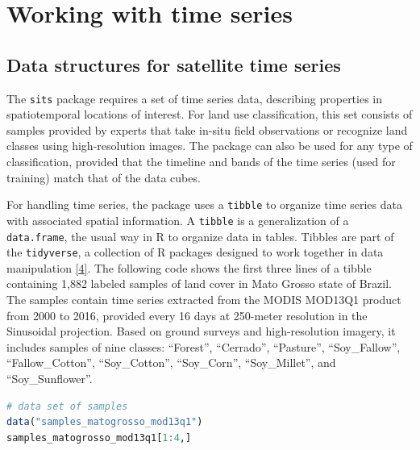 \documentclass[
  11pt,
]{report}
\newcommand{\passthrough}[1]{#1}
\begin{document}
\hypertarget{working-with-time-series}{%
\chapter*{Working with time series}\label{working-with-time-series}}

\hypertarget{data-structures-for-satellite-time-series}{%
\section*{Data structures for satellite time
series}\label{data-structures-for-satellite-time-series}}

The \passthrough{\lstinline!sits!} package requires a set of time series
data, describing properties in spatiotemporal locations of interest. For
land use classification, this set consists of samples provided by
experts that take in-situ field observations or recognize land classes
using high-resolution images. The package can also be used for any type
of classification, provided that the timeline and bands of the time
series (used for training) match that of the data cubes.

For handling time series, the package uses a
\passthrough{\lstinline!tibble!} to organize time series data with
associated spatial information. A \passthrough{\lstinline!tibble!} is a
generalization of a \passthrough{\lstinline!data.frame!}, the usual way
in R to organize data in tables. Tibbles are part of the
\passthrough{\lstinline!tidyverse!}, a collection of R packages designed
to work together in data manipulation
\protect\hyperlink{ref-Wickham2017}{{[}4{]}}. The following code shows
the first three lines of a tibble containing 1,882 labeled samples of
land cover in Mato Grosso state of Brazil. The samples contain time
series extracted from the MODIS MOD13Q1 product from 2000 to 2016,
provided every 16 days at 250-meter resolution in the Sinusoidal
projection. Based on ground surveys and high-resolution imagery, it
includes samples of nine classes: ``Forest'', ``Cerrado'', ``Pasture'',
``Soy\_Fallow'', ``Fallow\_Cotton'', ``Soy\_Cotton'', ``Soy\_Corn'',
``Soy\_Millet'', and ``Soy\_Sunflower''.

\begin{lstlisting}[language=R]
# data set of samples
data("samples_matogrosso_mod13q1")
samples_matogrosso_mod13q1[1:4,]
\end{lstlisting}
\end{document}
